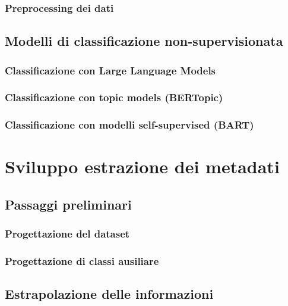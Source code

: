 \documentclass[12pt,a4paper,twoside]{book}
\begin{document}
\subsection{Preprocessing dei dati}


\section{Modelli di classificazione non-supervisionata}
\label{2.3}


\subsection{Classificazione con Large Language Models}
\label{2.3.1}


\subsection{Classificazione con topic models (BERTopic)}


\subsection{Classificazione con modelli self-supervised (BART)}


\chapter{Sviluppo estrazione dei metadati}
\label{3.0}


\section{Passaggi preliminari}
\label{3.1}


\subsection{Progettazione del dataset}
\label{3.1.1}


\subsection{Progettazione di classi ausiliare}


\section{Estrapolazione delle informazioni}

\end{document}
